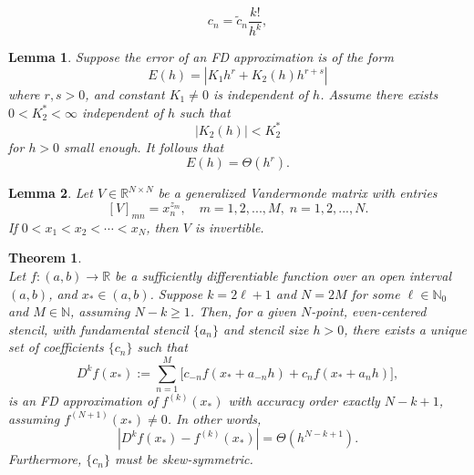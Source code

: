 \documentclass[10pt,a4paper]{amsart}
\newtheorem{theorem}{Theorem}
\newtheorem{lemma}{Lemma}
\newcommand{\FD}{D}
\newcommand{\N}{\mathbb{N}}
\newcommand{\R}{\mathbb{R}}
\newcommand{\xstar}{x_*}
\begin{document}
\begin{equation}\label{eq:tilde c}
	c_n = \tilde c_n \frac{k!}{h^k},
\end{equation}

\begin{lemma}\label{lem:BigTheta2}
Suppose the error of an FD approximation is of the form
\begin{equation}\label{eq:err_rs}
	E(h) = |K_1h^r + K_2(h)h^{r+s}|
\end{equation}
where $r,s>0$, and constant $K_1\neq 0$ is independent of $h$.
Assume there exists $0< K_2^*<\infty$ independent of $h$ such that
\[
	|K_2(h)| < K_2^*
\]
for $h>0$ small enough.
It follows that 
\[
	E(h) = \Theta(h^r).
\]
\end{lemma}

\begin{lemma}\label{lem:genVander}
Let $V\in\R^{N\times N}$ be a generalized Vandermonde matrix with entries
\[
	[V]_{mn} = x_n^{z_m}, \quad m=1,2,...,M, \; n=1,2,...,N.
\] 
If $0<x_1 < x_2 < \cdots < x_N$, then $V$ is invertible.
\end{lemma}

\begin{theorem} \label{thm:SCodd}
\\
Let $f:(a,b)\to\R$ be a sufficiently differentiable function over an open interval $(a,b)$, and $\xstar\in (a,b)$.
Suppose $k=2\ell+1$ and $N=2M$ for some $\ell\in\N_0$ and $M\in\N$, assuming $N-k\ge 1$.
Then, for a given $N$-point, even-centered stencil, with fundamental stencil $\{a_n\}$ and stencil size $h>0$, there exists a unique set of coefficients $\{c_n\}$ such that 
\[
	\FD^k f(\xstar) := \sum_{n=1}^M\Big[ c_{-n}f(\xstar+a_{-n}h)+c_nf(\xstar+a_nh) \Big],
\]
is an FD approximation of $f^{(k)}(\xstar)$ with accuracy order exactly $N-k+1$, assuming $f^{(N+1)}(\xstar)\neq 0$.
In other words, 
\[
	\left| \FD^k f(\xstar) - f^{(k)}(\xstar) \right| = \Theta(h^{N-k+1}).
\]
Furthermore, $\{c_n\}$ must be skew-symmetric.
\end{theorem}
\end{document}
